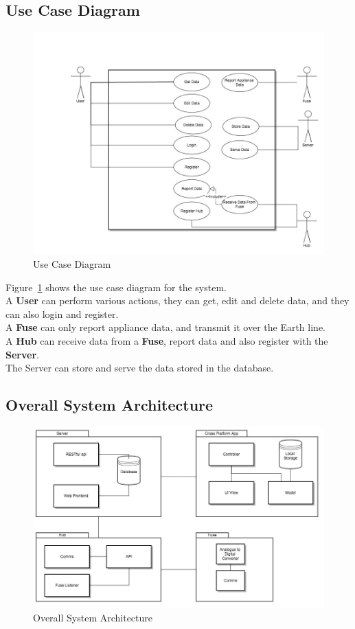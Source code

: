 \documentclass[preprint,12pt,3p]{elsarticle}
\begin{document}
\subsection{Use Case Diagram}
\begin{figure}[H]
    \includegraphics[width=\columnwidth]{diagrams/UseCase}
    \caption {Use Case Diagram}
    \label{fig:usecaseoverall}
\end{figure}
Figure~\ref{fig:usecaseoverall} shows the use case diagram for the system.\\
A \textbf{User} can perform various actions, they can get, edit and delete data, and they can also login and register.\\
A \textbf{Fuse} can only report appliance data, and transmit it over the Earth line.\\
A \textbf{Hub} can receive data from a \textbf{Fuse}, report data and also register with the \textbf{Server}.\\
The Server can store and serve the data stored in the database.

\subsection{Overall System Architecture}
\begin{figure}[H]
    \includegraphics[width=\columnwidth]{diagrams/Architecture}
    \caption {Overall System Architecture}
    \label{fig:systemarchoverall}
\end{figure}
\end{document}
